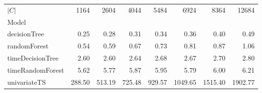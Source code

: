 \begin{tabular}{lrrrrrrr}
\toprule
$|C|$ & 1164 & 2604 & 4044 & 5484 & 6924 & 8364 & 12684 \\
Model &  &  &  &  &  &  &  \\
\midrule
decisionTree & 0.25 & 0.28 & 0.31 & 0.34 & 0.36 & 0.40 & 0.49 \\
randomForest & 0.54 & 0.59 & 0.67 & 0.73 & 0.81 & 0.87 & 1.06 \\
timeDecisionTree & 2.60 & 2.60 & 2.64 & 2.68 & 2.67 & 2.70 & 2.80 \\
timeRandomForest & 5.62 & 5.77 & 5.87 & 5.95 & 5.79 & 6.00 & 6.21 \\
univariateTS & 288.50 & 513.19 & 725.48 & 929.57 & 1049.65 & 1515.40 & 1902.77 \\
\bottomrule
\end{tabular}
